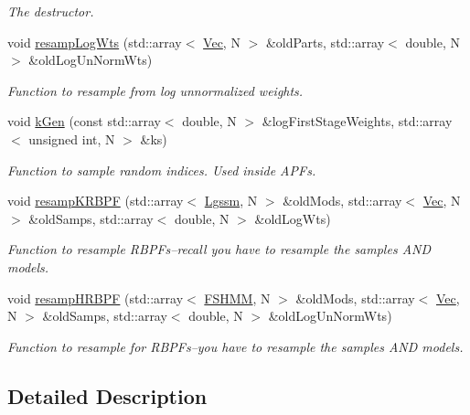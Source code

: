 \begin{DoxyCompactItemize}
\begin{DoxyCompactList}\small\item\em The destructor. \end{DoxyCompactList}\item 
void \hyperlink{classMNResamp_a5c84e23bbe2f57984084835995dc41fd}{resamp\+Log\+Wts} (std\+::array$<$ \hyperlink{apf__filter_8h_a4c7df05c6f5e8a0d15ae14bcdbc07152}{Vec}, N $>$ \&old\+Parts, std\+::array$<$ double, N $>$ \&old\+Log\+Un\+Norm\+Wts)
\begin{DoxyCompactList}\small\item\em Function to resample from log unnormalized weights. \end{DoxyCompactList}\item 
void \hyperlink{classMNResamp_a152ee53e6df53587bea13bf8c9e74322}{k\+Gen} (const std\+::array$<$ double, N $>$ \&log\+First\+Stage\+Weights, std\+::array$<$ unsigned int, N $>$ \&ks)
\begin{DoxyCompactList}\small\item\em Function to sample random indices. Used inside A\+P\+Fs. \end{DoxyCompactList}\item 
void \hyperlink{classMNResamp_aefaf6ba9a6b993a530ae42413b878565}{resamp\+K\+R\+B\+PF} (std\+::array$<$ \hyperlink{classLgssm}{Lgssm}, N $>$ \&old\+Mods, std\+::array$<$ \hyperlink{apf__filter_8h_a4c7df05c6f5e8a0d15ae14bcdbc07152}{Vec}, N $>$ \&old\+Samps, std\+::array$<$ double, N $>$ \&old\+Log\+Wts)
\begin{DoxyCompactList}\small\item\em Function to resample R\+B\+P\+Fs--recall you have to resample the samples A\+ND models. \end{DoxyCompactList}\item 
void \hyperlink{classMNResamp_a2cec5eaa8aa6dd8b8e228e324ad3e437}{resamp\+H\+R\+B\+PF} (std\+::array$<$ \hyperlink{classFSHMM}{F\+S\+H\+MM}, N $>$ \&old\+Mods, std\+::array$<$ \hyperlink{apf__filter_8h_a4c7df05c6f5e8a0d15ae14bcdbc07152}{Vec}, N $>$ \&old\+Samps, std\+::array$<$ double, N $>$ \&old\+Log\+Un\+Norm\+Wts)
\begin{DoxyCompactList}\small\item\em Function to resample for R\+B\+P\+Fs--you have to resample the samples A\+ND models. \end{DoxyCompactList}\end{DoxyCompactItemize}


\subsection{Detailed Description}
